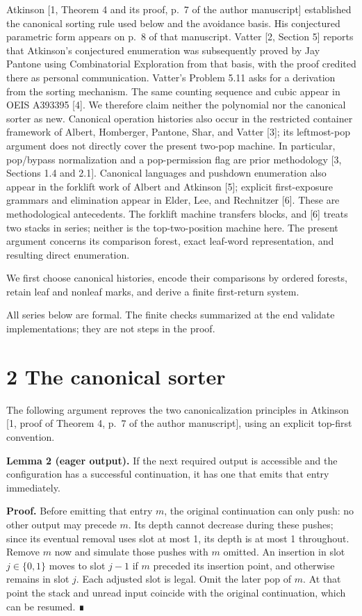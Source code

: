 \documentclass[11pt,letterpaper]{article}
\begin{document}
Atkinson {[}1, Theorem 4 and its proof, p.~7 of the author manuscript{]}
established the canonical sorting rule used below and the avoidance
basis. His conjectured parametric form appears on p.~8 of that
manuscript. Vatter {[}2, Section 5{]} reports that Atkinson's
conjectured enumeration was subsequently proved by Jay Pantone using
Combinatorial Exploration from that basis, with the proof credited there
as personal communication. Vatter's Problem 5.11 asks for a derivation
from the sorting mechanism. The same counting sequence and cubic appear
in OEIS A393395 {[}4{]}. We therefore claim neither the polynomial nor
the canonical sorter as new. Canonical operation histories also occur in
the restricted container framework of Albert, Homberger, Pantone, Shar,
and Vatter {[}3{]}; its leftmost-pop argument does not directly cover
the present two-pop machine. In particular, pop/bypass normalization and
a pop-permission flag are prior methodology {[}3, Sections 1.4 and
2.1{]}. Canonical languages and pushdown enumeration also appear in the
forklift work of Albert and Atkinson {[}5{]}; explicit first-exposure
grammars and elimination appear in Elder, Lee, and Rechnitzer {[}6{]}.
These are methodological antecedents. The forklift machine transfers
blocks, and {[}6{]} treats two stacks in series; neither is the
top-two-position machine here. The present argument concerns its
comparison forest, exact leaf-word representation, and resulting direct
enumeration.

We first choose canonical histories, encode their comparisons by ordered
forests, retain leaf and nonleaf marks, and derive a finite first-return
system.

All series below are formal. The finite checks summarized at the end
validate implementations; they are not steps in the proof.

\section{2 The canonical sorter}\label{the-canonical-sorter}

The following argument reproves the two canonicalization principles in
Atkinson {[}1, proof of Theorem 4, p.~7 of the author manuscript{]},
using an explicit top-first convention.

\textbf{Lemma 2 (eager output).} If the next required output is
accessible and the configuration has a successful continuation, it has
one that emits that entry immediately.

\textbf{Proof.} Before emitting that entry \(m\), the original
continuation can only push: no other output may precede \(m\). Its depth
cannot decrease during these pushes; since its eventual removal uses
slot at most 1, its depth is at most 1 throughout. Remove \(m\) now and
simulate those pushes with \(m\) omitted. An insertion in slot
\(j\in\{0,1\}\) moves to slot \(j-1\) if \(m\) preceded its insertion
point, and otherwise remains in slot \(j\). Each adjusted slot is legal.
Omit the later pop of \(m\). At that point the stack and unread input
coincide with the original continuation, which can be resumed. ∎
\end{document}
